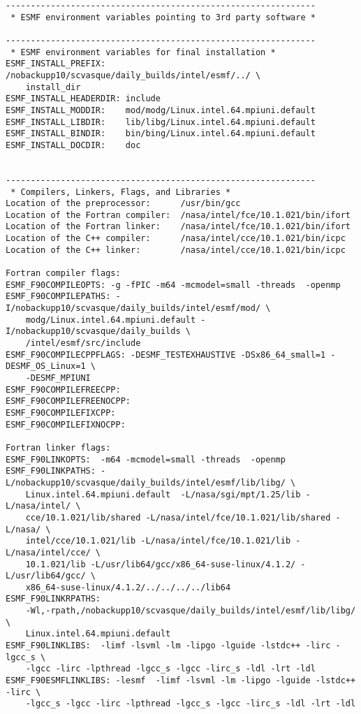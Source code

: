 \begin{verbatim}
--------------------------------------------------------------
 * ESMF environment variables pointing to 3rd party software *
 
--------------------------------------------------------------
 * ESMF environment variables for final installation *
ESMF_INSTALL_PREFIX:    /nobackupp10/scvasque/daily_builds/intel/esmf/../ \
	install_dir
ESMF_INSTALL_HEADERDIR: include
ESMF_INSTALL_MODDIR:    mod/modg/Linux.intel.64.mpiuni.default
ESMF_INSTALL_LIBDIR:    lib/libg/Linux.intel.64.mpiuni.default
ESMF_INSTALL_BINDIR:    bin/bing/Linux.intel.64.mpiuni.default
ESMF_INSTALL_DOCDIR:    doc
 
 
--------------------------------------------------------------
 * Compilers, Linkers, Flags, and Libraries *
Location of the preprocessor:      /usr/bin/gcc
Location of the Fortran compiler:  /nasa/intel/fce/10.1.021/bin/ifort
Location of the Fortran linker:    /nasa/intel/fce/10.1.021/bin/ifort
Location of the C++ compiler:      /nasa/intel/cce/10.1.021/bin/icpc
Location of the C++ linker:        /nasa/intel/cce/10.1.021/bin/icpc

Fortran compiler flags:
ESMF_F90COMPILEOPTS: -g -fPIC -m64 -mcmodel=small -threads  -openmp
ESMF_F90COMPILEPATHS: -I/nobackupp10/scvasque/daily_builds/intel/esmf/mod/ \
	modg/Linux.intel.64.mpiuni.default -I/nobackupp10/scvasque/daily_builds \
	/intel/esmf/src/include 
ESMF_F90COMPILECPPFLAGS: -DESMF_TESTEXHAUSTIVE -DSx86_64_small=1 -DESMF_OS_Linux=1 \
	-DESMF_MPIUNI
ESMF_F90COMPILEFREECPP: 
ESMF_F90COMPILEFREENOCPP: 
ESMF_F90COMPILEFIXCPP: 
ESMF_F90COMPILEFIXNOCPP: 

Fortran linker flags:
ESMF_F90LINKOPTS:  -m64 -mcmodel=small -threads  -openmp
ESMF_F90LINKPATHS: -L/nobackupp10/scvasque/daily_builds/intel/esmf/lib/libg/ \
	Linux.intel.64.mpiuni.default  -L/nasa/sgi/mpt/1.25/lib -L/nasa/intel/ \
	cce/10.1.021/lib/shared -L/nasa/intel/fce/10.1.021/lib/shared -L/nasa/ \
	intel/cce/10.1.021/lib -L/nasa/intel/fce/10.1.021/lib -L/nasa/intel/cce/ \
	10.1.021/lib -L/usr/lib64/gcc/x86_64-suse-linux/4.1.2/ -L/usr/lib64/gcc/ \
	x86_64-suse-linux/4.1.2/../../../../lib64
ESMF_F90LINKRPATHS: 
	-Wl,-rpath,/nobackupp10/scvasque/daily_builds/intel/esmf/lib/libg/ \
	Linux.intel.64.mpiuni.default
ESMF_F90LINKLIBS:  -limf -lsvml -lm -lipgo -lguide -lstdc++ -lirc -lgcc_s \
	-lgcc -lirc -lpthread -lgcc_s -lgcc -lirc_s -ldl -lrt -ldl
ESMF_F90ESMFLINKLIBS: -lesmf  -limf -lsvml -lm -lipgo -lguide -lstdc++ -lirc \
	-lgcc_s -lgcc -lirc -lpthread -lgcc_s -lgcc -lirc_s -ldl -lrt -ldl


\end{verbatim}
